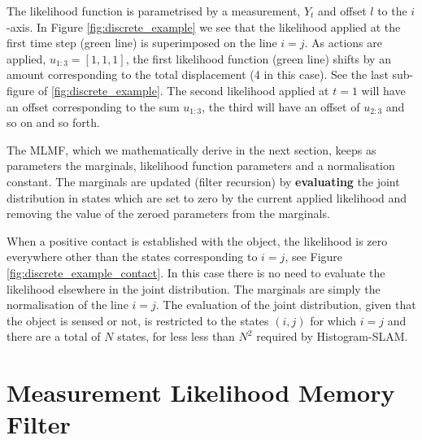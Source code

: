 \begin{center}
\begin{minipage}{0.55\textwidth}
\end{minipage}
\end{center}

The likelihood function is parametrised by a measurement, $Y_t$ and offset $l$ to the $i$-axis. In Figure \ref{fig:discrete_example} we see that
the likelihood applied at the first time step (green line) is superimposed on the line $i=j$. As actions are applied, $u_{1:3}=[1,1,1]$, 
the first likelihood function (green line) shifts by an amount corresponding to the total displacement (4 in this case). See the last sub-figure of
\ref{fig:discrete_example}. The second likelihood applied at $t=1$ will have an offset corresponding to the sum $u_{1:3}$, the third will have 
an offset of $u_{2:3}$ and so on and so forth.

The MLMF, which we mathematically derive in the next section, keeps as parameters the marginals, likelihood function parameters and a normalisation 
constant. The marginals are updated (filter recursion) by \textbf{evaluating} the joint distribution in states which are set to zero by the current 
applied likelihood and removing the value of the zeroed parameters from the marginals. 

When a positive contact is established with the object, the likelihood is zero everywhere other than the states corresponding to  $i=j$, 
see Figure \ref{fig:discrete_example_contact}. In this case there is no need to evaluate the likelihood elsewhere
in the joint distribution. The marginals are simply the normalisation of the line $i=j$. The evaluation of the joint distribution, 
given that the object is sensed or not, is restricted to the states $(i,j)$ for which $i=j$ and there are a total of $N$ states,
for less less than $N^2$ required by Histogram-SLAM.


\FloatBarrier
\section{Measurement Likelihood Memory Filter}\label{ch5:MLMF}

